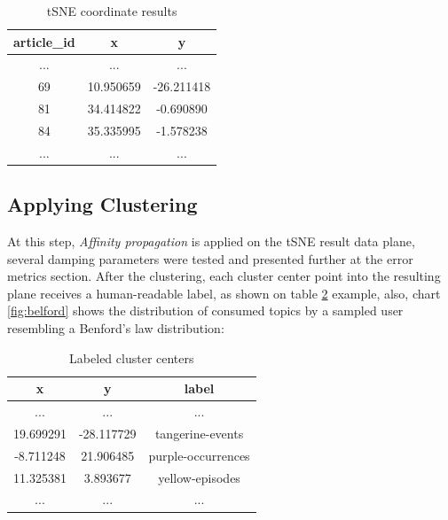 \documentclass[ecp,tc,english]{iiufrgs}
\begin{document}
        \begin{table}[!ht]
            \centering
            \begin{tabular}{ |c|c|c| } 
                \hline
                article\_id & x & y \\
                \hline 
                ... & ... & ... \\
                69 & 10.950659 & -26.211418 \\ 
                81 & 34.414822 & -0.690890 \\ 
                84 & 35.335995 & -1.578238 \\ 
                ... & ... & ... \\
                \hline
            \end{tabular}
            \caption{tSNE coordinate results}
            \label{tab:tsne_results}
        \end{table}
        
        \subsection{Applying Clustering}
        At this step, \textit{Affinity propagation} is applied on the tSNE result data plane, several damping parameters were tested and presented further at the error metrics section. 
        After the clustering, each cluster center point into the resulting plane receives a human-readable label, as shown on table \ref{tab:labeled_clusters} example, also, chart \ref{fig:belford} shows the distribution of consumed topics by a sampled user resembling a Benford's law distribution:
        
        
        \begin{table}[H]
            \centering
                \begin{tabular}{ |c|c|c| } 
                \hline
                x & y & label \\
                \hline 
                ... & ...  & ... \\
                19.699291 & -28.117729 & tangerine-events \\ 
                -8.711248 & 21.906485 & purple-occurrences \\ 
                11.325381 & 3.893677 & yellow-episodes \\ 
                ... & ...  & ...  \\
                \hline
                \end{tabular}
            \caption{Labeled cluster centers}
            \label{tab:labeled_clusters}
        \end{table}
        
\end{document}
